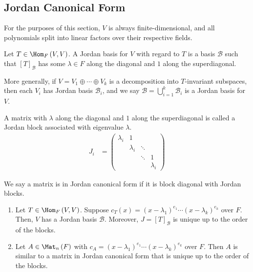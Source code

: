 \documentclass[10pt]{mypackage}
\begin{document}
\subsection{Jordan Canonical Form}%
For the purposes of this section, $V$ is always finite-dimensional, and all polynomials split into linear factors over their respective fields.
\begin{definition}
  Let $T\in \Hom_{F}\left(V,V\right)$. A Jordan basis for $V$ with regard to $T$ is a basis $\mathcal{B}$ such that $\left[T\right]_{\mathcal{B}}$ has some $\lambda \in F$ along the diagonal and $1$ along the superdiagonal.\newline

  More generally, if $V = V_1\oplus \cdots \oplus V_k$ is a decomposition into $T$-invariant subspaces, then each $V_i$ has Jordan basis $\mathcal{B}_i$, and we say $\mathcal{B} = \bigcup_{i=1}^{k}\mathcal{B}_i$ is a Jordan basis for $V$.
\end{definition}
\begin{definition}
  A matrix with $\lambda$ along the diagonal and $1$ along the superdiagonal is called a Jordan block associated with eigenvalue $\lambda$.
  \begin{align*}
    J_i &= \begin{pmatrix}
\lambda_i & 1            & \;     & \;  \\
\;        & \lambda_i    & \ddots & \;  \\
\;        & \;           & \ddots & 1   \\
\;        & \;           & \;     & \lambda_i       
\end{pmatrix}
  \end{align*}
\end{definition}
\begin{definition}
  We say a matrix is in Jordan canonical form if it is block diagonal with Jordan blocks.
\end{definition}
\begin{theorem}\hfill
  \begin{enumerate}[(1)]
    \item Let $T\in \Hom_{F}\left(V,V\right)$. Suppose $c_T(x) = \left(x-\lambda_1\right)^{e_1}\cdots \left(x-\lambda_k\right)^{e_k}$ over $F$. Then, $V$ has a Jordan basis $\mathcal{B}$. Moreover, $J = \left[T\right]_{\mathcal{B}}$ is unique up to the order of the blocks.
    \item Let $A\in \Mat_{n}\left(F\right)$ with $c_A = \left(x-\lambda_1\right)^{e_1}\cdots \left(x-\lambda_k\right)^{e_k}$ over $F$. Then $A$ is similar to a matrix in Jordan canonical form that is unique up to the order of the blocks.
  \end{enumerate}
\end{theorem}
\end{document}
